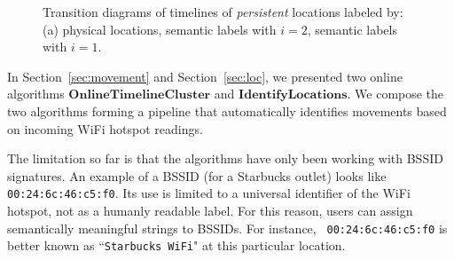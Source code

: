 \begin{figure}[t]
    \centering
    \caption{Transition diagrams of timelines of {\em persistent} locations labeled by: (a)
        physical locations, semantic labels with $i=2$, semantic labels with
        $i=1$.}
\end{figure}

In Section~\ref{sec:movement} and Section~\ref{sec:loc}, we presented two online
algorithms $\mathbf{OnlineTimelineCluster}$ and $\mathbf{IdentifyLocations}$.
We compose the two algorithms forming a pipeline that automatically identifies
movements based on incoming WiFi hotspot readings.

The limitation so far is that the algorithms have only been working with
BSSID signatures.  An example of a BSSID (for a Starbucks outlet) looks like 
{\tt 00:24:6c:46:c5:f0}.  Its use is limited to a universal identifier of the
WiFi hotspot, not as a humanly readable label.  For this reason, users can
assign semantically meaningful strings to BSSIDs.  For instance, {\tt
00:24:6c:46:c5:f0} is better known as ``{\tt Starbucks WiFi}" at this particular
location.

